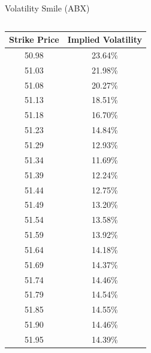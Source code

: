 \documentclass{beamer}
\begin{document}
\begin{frame}[shrink=50]{{\color{cyan}Volatility Smile ({\color{magenta}ABX})}}
\bigskip
\begin{columns}

\begin{column}{0.3\textwidth}
\begin{table}[H]
\begin{center}
\begin{tabular}{cc}
\hline
\textbf{Strike Price}	& \textbf{Implied Volatility}\\
\hline \hline
50.98	& 23.64\%\\
51.03	& 21.98\%\\
51.08	& 20.27\%\\
51.13	& 18.51\%\\
51.18	& 16.70\%\\
51.23	& 14.84\%\\
51.29	& 12.93\%\\
{\color{orange}51.34}	& 11.69\%\\
51.39	& 12.24\%\\
51.44	& 12.75\%\\
51.49	& 13.20\%\\
51.54	& 13.58\%\\
51.59	& 13.92\%\\
51.64	& 14.18\%\\
51.69	& 14.37\%\\
51.74	& 14.46\%\\
51.79	& 14.54\%\\
51.85	& 14.55\%\\
51.90	& 14.46\%\\
51.95	& 14.39\%\\
\hline
\end{tabular}
\label{tab:ABX_volatility_smile}
\end{center}
\end{table}
\end{column}


\end{columns}
\end{frame}
\end{document}
